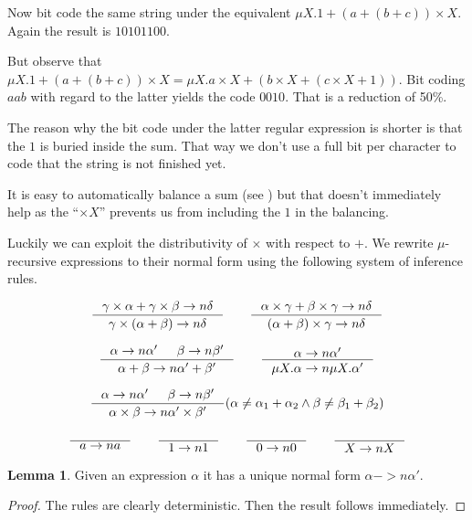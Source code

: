 \documentclass[a4paper, oneside]{memoir}
\let\fref\undefined
\theoremstyle{definition}
\newtheorem{lemma}{Lemma}
\begin{document}
Now bit code the same string under the equivalent $\mu X. 1 + (a + (b + c))
\times X$. Again the result is $10101100$.

But observe that $\mu X. 1 + (a + (b + c)) \times X = \mu X. a \times X + (b
\times X + (c \times X + 1))$. Bit coding $aab$ with regard to the latter yields
the code $0010$. That is a reduction of 50\%.

The reason why the bit code under the latter regular expression is shorter is
that the $1$ is buried inside the sum. That way we don't use a full bit per
character to code that the string is not finished yet.

It is easy to automatically balance a sum (see \fref{sec:sum-balancing-using})
but that doesn't immediately help as the ``$\times X$'' prevents us from
including the $1$ in the balancing.

Luckily we can exploit the distributivity of $\times$ with respect to $+$. We
rewrite $\mu$-recursive expressions to their normal form using the following
system of inference rules.

\[
\inference{\gamma \times \alpha + \gamma \times \beta ->n \delta}{\gamma \times
  (\alpha + \beta) ->n \delta} \qquad
\inference{\alpha \times \gamma + \beta \times \gamma ->n \delta}{(\alpha +
  \beta) \times \gamma ->n \delta}
\]

\[
\inference{\alpha ->n \alpha' & \beta ->n \beta'}{\alpha + \beta ->n \alpha' +
  \beta'} \qquad
\inference{\alpha ->n \alpha'}{\mu X. \alpha ->n \mu X. \alpha'}
\]

\[
\inference{\alpha ->n \alpha' & \beta ->n \beta'}{\alpha \times \beta ->n \alpha'
  \times \beta'}(\alpha \neq \alpha_1 + \alpha_2 \land \beta \neq \beta_1 + \beta_2)
\]

\[
\inference{}{a ->n a} \qquad
\inference{}{1 ->n 1} \qquad
\inference{}{0 ->n 0} \qquad
\inference{}{X ->n X}
\]

\begin{lemma}
  Given an expression $\alpha$ it has a unique normal form $\alpha ->n \alpha'$.
  \begin{proof}
    The rules are clearly deterministic. Then the result follows immediately.
  \end{proof}
\end{lemma}
\end{document}
